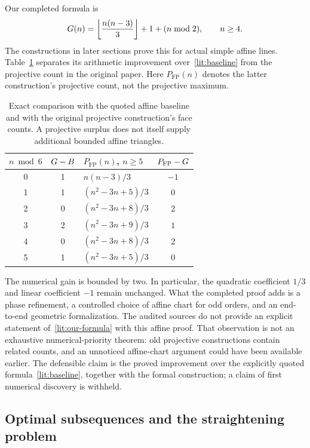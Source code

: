 Our completed formula is
\begin{equation}
 G(n)=\left\lfloor\frac{n(n-3)}3\right\rfloor+1+(n\bmod2),
 \qquad n\ge4.
 \label{lit:our-formula}
\end{equation}
The constructions in later sections prove this for actual simple affine lines. Table~\ref{lit:residue-comparison} separates its arithmetic improvement over~\eqref{lit:baseline} from the projective count in the original paper. Here $P_{\mathrm{FP}}(n)$ denotes the latter construction's projective count, not the projective maximum.

\begin{table}[htbp]
\centering\small
\begin{tabular}{@{}cclc@{}}
\toprule
$n\bmod6$ & $G-B$ & $P_{\mathrm{FP}}(n)$, $n\ge5$ & $P_{\mathrm{FP}}-G$\\
\midrule
0 & 1 & $n(n-3)/3$ & $-1$\\
1 & 1 & $(n^2-3n+5)/3$ & $0$\\
2 & 0 & $(n^2-3n+8)/3$ & $2$\\
3 & 2 & $(n^2-3n+9)/3$ & $1$\\
4 & 0 & $(n^2-3n+8)/3$ & $2$\\
5 & 1 & $(n^2-3n+5)/3$ & $0$\\
\bottomrule
\end{tabular}
\caption{Exact comparison with the quoted affine baseline and with the original projective construction's face counts. A projective surplus does not itself supply additional bounded affine triangles.}
\label{lit:residue-comparison}
\end{table}

The numerical gain is bounded by two. In particular, the quadratic coefficient $1/3$ and linear coefficient $-1$ remain unchanged. What the completed proof adds is a phase refinement, a controlled choice of affine chart for odd orders, and an end-to-end geometric formalization. The audited sources do not provide an explicit statement of~\eqref{lit:our-formula} with this affine proof. That observation is not an exhaustive numerical-priority theorem: old projective constructions contain related counts, and an unnoticed affine-chart argument could have been available earlier. The defensible claim is the proved improvement over the explicitly quoted formula~\eqref{lit:baseline}, together with the formal construction; a claim of first numerical discovery is withheld.

\subsection{Optimal subsequences and the straightening problem}

